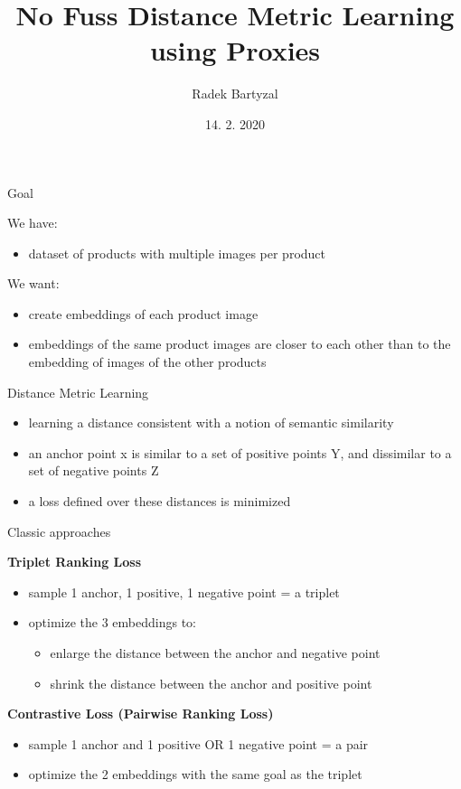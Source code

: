 \documentclass{beamer}
\begin{document}
\title[Distance Metrics with Proxies]{No Fuss Distance Metric Learning using Proxies}  
\author{Radek Bartyzal}
\date{14. 2. 2020} 

\frame{\titlepage} 

\begin{frame}{Goal}

We have:
\begin{itemize}
\item dataset of products with multiple images per product
\end{itemize}

\vfill

We want:
\begin{itemize}
\item create embeddings of each product image 
\item embeddings of the same product images are closer to each other than to the embedding of images of the other products
\end{itemize}

\end{frame}

\begin{frame}{Distance Metric Learning}

\begin{itemize}
\item learning a distance consistent with a notion of semantic similarity
\item an anchor point x is similar to
a set of positive points Y, and dissimilar to a set of negative
points Z
\item a loss defined over these distances is minimized 
\end{itemize}

\end{frame}

\begin{frame}{Classic approaches}

\textbf{Triplet Ranking Loss}
\begin{itemize}
\item sample 1 anchor, 1 positive, 1 negative point = a triplet
\item optimize the 3 embeddings to:
\begin{itemize}
\item enlarge the distance between the anchor and negative point
\item shrink the distance between the anchor and positive point
\end{itemize}
\end{itemize}

\vfill

\textbf{Contrastive Loss (Pairwise Ranking Loss)}
\begin{itemize}
\item sample 1 anchor and 1 positive OR 1 negative point = a pair
\item optimize the 2 embeddings with the same goal as the triplet
\end{itemize}

\end{frame}
\end{document}
